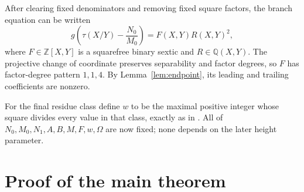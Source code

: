 \documentclass[11pt,reqno]{amsart}
\theoremstyle{definition}
\theoremstyle{remark}
\newcommand{\Q}{\mathbb{Q}}
\newcommand{\Z}{\mathbb{Z}}
\begin{document}
After clearing fixed denominators and removing fixed square factors, the
branch equation can be written
\begin{equation}\label{eq:binary-form-identity}
  g\!\left(\tau(X/Y)-\frac{N_0}{M_0}\right)
  =F(X,Y)R(X,Y)^2,
\end{equation}
where \(F\in\Z[X,Y]\) is a squarefree binary sextic and
\(R\in\Q(X,Y)\).  The projective change of coordinate preserves separability
and factor degrees, so \(F\) has factor-degree pattern \(1,1,4\).  By
Lemma~\ref{lem:endpoint}, its leading and trailing coefficients are nonzero.

For the final residue class define \(w\) to be the maximal positive integer
whose square divides every value in that class, exactly as in
\cite[p.~948]{StewartTop1995}.  All of
\(N_0,M_0,N_1,A,B,M,F,w,\Omega\) are now fixed; none depends on the later
height parameter.

\section{Proof of the main theorem}\label{sec:main-proof}
\end{document}
